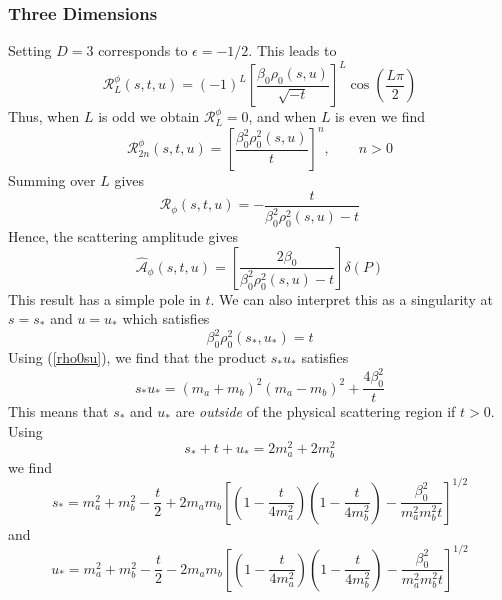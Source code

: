 \subsubsection{Three Dimensions}
Setting $D = 3$ corresponds to $\epsilon = -1/2$. This leads to
\begin{equation}
	\mathcal{R}_{L}^{\phi}(s, t, u) = (-1)^{L} \left[ \frac{\beta_{0} \rho_{0}(s,u)}{\sqrt{-t}} \right]^{L} \cos{\left( \frac{L \pi}{2} \right)}
\end{equation}
Thus, when $L$ is odd we obtain $\mathcal{R}_{L}^{\phi} = 0$, and when $L$ is even we find
\begin{equation}
	\mathcal{R}_{2n}^{\phi}(s, t, u) = \left[ \frac{\beta_{0}^{2} \rho_{0}^{2}(s,u)}{t} \right]^{n}, \qquad n > 0
\end{equation}
Summing over $L$ gives
\begin{equation}
	\mathcal{R}_{\phi}(s, t, u) = -\frac{t}{\beta_{0}^{2} \rho_{0}^{2}(s,u) - t}
\end{equation}
Hence, the scattering amplitude gives
\begin{equation}
	\widehat{\mathcal{A}}_{\phi}(s, t, u) = \left[ \frac{2 \beta_{0} }{\beta_{0}^{2} \rho_{0}^{2}(s,u) - t} \right] \delta(P)
\end{equation}
This result has a simple pole in $t$. We can also interpret this as a singularity at $s = s_{*}$ and $u = u_{*}$ which satisfies
\begin{equation}
	\beta_{0}^{2} \rho_{0}^{2}(s_{*}, u_{*}) = t
\end{equation}
Using (\ref{rho0su}), we find that the product $s_{*} u_{*}$ satisfies
\begin{equation}
	s_{*} u_{*} = (m_{a} + m_{b})^{2}(m_{a} - m_{b})^{2} + \frac{4 \beta_{0}^{2}}{t} \label{sJuJSca3}
\end{equation}
This means that $s_{*}$ and $u_{*}$ are \textit{outside} of the physical scattering region if $t > 0$. Using
\begin{equation}
	s_{*} + t + u_{*} = 2m_{a}^{2} + 2m_{b}^{2}
\end{equation}
we find
\begin{equation}
	s_{*} = m_{a}^{2} + m_{b}^{2} - \frac{t}{2} + 2 m_{a} m_{b} \left[ \left(1 - \frac{t}{4 m_{a}^{2}} \right) \left( 1 - \frac{t}{4 m_{b}^{2}} \right) - \frac{\beta^{2}_{0}}{m_{a}^{2} m_{b}^{2} t} \right]^{1/2}
\end{equation}
and
\begin{equation}
	u_{*} = m_{a}^{2} + m_{b}^{2} - \frac{t}{2} - 2 m_{a} m_{b} \left[ \left(1 - \frac{t}{4 m_{a}^{2}} \right) \left( 1 - \frac{t}{4 m_{b}^{2}} \right) - \frac{\beta^{2}_{0}}{m_{a}^{2} m_{b}^{2} t} \right]^{1/2}
\end{equation}
